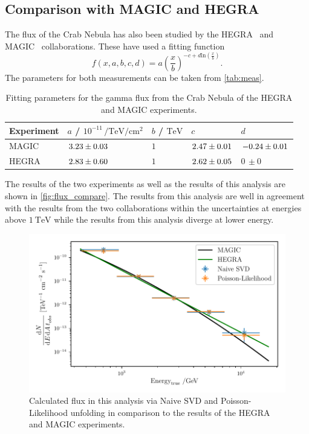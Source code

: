 \subsection{Comparison with MAGIC and HEGRA}
The flux of the Crab Nebula has also been studied by the HEGRA~\cite{HEGRA} and MAGIC~\cite{MAGIC} collaborations.
These have used a fitting function
\begin{equation}
  f \left( x,a,b,c,d \right) = a \left( \frac{x}{b} \right)^{-c + d \mathrm{ln}\left( \frac{x}{b} \right)}.
\end{equation}
The parameters for both measurements can be taken from \autoref{tab:meas}.

\begin{table}[tb]
  \centering
  \caption{Fitting parameters for the gamma flux from the Crab Nebula of the HEGRA and MAGIC experiments.}
  \begin{tabular}{l l l l l}
    \toprule
    Experiment & $a$ / $10^{-11}\,\si{\per\tera\eV\per\cm\squared}$ & $b$ / $\si{\tera\eV}$  & $c$ & $d$ \\
    \midrule
    MAGIC & $\num{3.23 \pm .03}$ & $\num{1}$ & $\num{2.47 \pm .01}$ & $\num{-0.24 \pm .01}$ \\
    HEGRA & $\num{2.83 \pm .6}$ & $\num{1}$ & $\num{2.62 \pm .05}$ & $0\,\pm 0$ \\
    \bottomrule
  \end{tabular}
  \label{tab:meas}
\end{table}
The results of the two experiments as well as the results of this analysis are shown in \autoref{fig:flux_compare}. The results from this analysis are well in agreement with the results from the two collaborations within the uncertainties at energies above $\SI{1}{\tera\eV}$ while the results from this analysis diverge at lower energy.

\begin{figure}[tb]
  \centering
  \includegraphics[width=.7\textwidth]{plots/flux_compare.pdf}
  \caption{Calculated flux in this analysis via Naive SVD and Poisson-Likelihood unfolding in comparison to the results of the HEGRA and MAGIC experiments.}
  \label{fig:flux_compare}
\end{figure}

